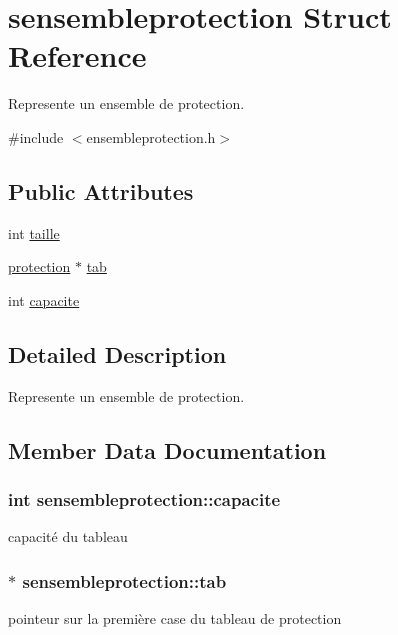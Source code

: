 \hypertarget{structsensembleprotection}{}\section{sensembleprotection Struct Reference}
\label{structsensembleprotection}


Represente un ensemble de protection.  




{\ttfamily \#include $<$ensembleprotection.\+h$>$}

\subsection*{Public Attributes}
\begin{DoxyCompactItemize}
\item 
int \hyperlink{structsensembleprotection_ad1d2447259e1f0db56de3ef12199e049}{taille}
\item 
\hyperlink{structsprotection}{protection} $\ast$ \hyperlink{structsensembleprotection_a111fbe59208f6631c6490f11584704f7}{tab}
\item 
int \hyperlink{structsensembleprotection_aea291f44af0bd34fae751d47189e923c}{capacite}
\end{DoxyCompactItemize}


\subsection{Detailed Description}
Represente un ensemble de protection. 

\subsection{Member Data Documentation}
\subsubsection[{\texorpdfstring{capacite}{capacite}}]{\setlength{\rightskip}{0pt plus 5cm}int sensembleprotection\+::capacite}\hypertarget{structsensembleprotection_aea291f44af0bd34fae751d47189e923c}{}\label{structsensembleprotection_aea291f44af0bd34fae751d47189e923c}
capacité du tableau 
\subsubsection[{\texorpdfstring{tab}{tab}}]{$\ast$ sensembleprotection\+::tab}\hypertarget{structsensembleprotection_a111fbe59208f6631c6490f11584704f7}{}\label{structsensembleprotection_a111fbe59208f6631c6490f11584704f7}
pointeur sur la première case du tableau de protection 
